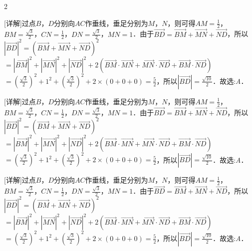 \documentclass[fontset=none]{ctexart}
\begin{document}
\begin{multicols}{2}
\noindent\begin{minipage}[t]{41.000mm}\raggedright [详解]过点\(B\)，\(D\)分别向\(AC\)作垂线，垂足分别为\(M\)，\(N\)，则可得\(AM = \frac{1}{2}\)，\(BM = \frac{\sqrt{3}}{2}\)，\(CN = \frac{1}{2}\)，\(DN = \frac{\sqrt{3}}{2}\)，\(MN = 1\)．由于\(\overrightarrow{BD} = \overrightarrow{BM} + \overrightarrow{MN} + \overrightarrow{ND}\)，所以\(|\overrightarrow{BD}|^{2} = {(\overrightarrow{BM} + \overrightarrow{MN} + \overrightarrow{ND})}^{2}\)\(= |\overrightarrow{BM}|^{2} + |\overrightarrow{MN}|^{2} + |\overrightarrow{ND}|^{2} + 2(\overrightarrow{BM} \cdot \overrightarrow{MN} + \overrightarrow{MN} \cdot \overrightarrow{ND} + \overrightarrow{BM} \cdot \overrightarrow{ND})\)\(= ( \frac{\sqrt{3}}{2} )^{2} + 1^{2} + ( \frac{\sqrt{3}}{2} )^{2} + 2 \times (0 + 0 + 0) = \frac{5}{2}\)，所以\(|\overrightarrow{BD}| = \frac{\sqrt{10}}{2}\)．故选:\emph{A}．\end{minipage}\par
\vspace{2mm}
\noindent\begin{minipage}[t]{43.000mm}\raggedright [详解]过点\(B\)，\(D\)分别向\(AC\)作垂线，垂足分别为\(M\)，\(N\)，则可得\(AM = \frac{1}{2}\)，\(BM = \frac{\sqrt{3}}{2}\)，\(CN = \frac{1}{2}\)，\(DN = \frac{\sqrt{3}}{2}\)，\(MN = 1\)．由于\(\overrightarrow{BD} = \overrightarrow{BM} + \overrightarrow{MN} + \overrightarrow{ND}\)，所以\(|\overrightarrow{BD}|^{2} = {(\overrightarrow{BM} + \overrightarrow{MN} + \overrightarrow{ND})}^{2}\)\(= |\overrightarrow{BM}|^{2} + |\overrightarrow{MN}|^{2} + |\overrightarrow{ND}|^{2} + 2(\overrightarrow{BM} \cdot \overrightarrow{MN} + \overrightarrow{MN} \cdot \overrightarrow{ND} + \overrightarrow{BM} \cdot \overrightarrow{ND})\)\(= ( \frac{\sqrt{3}}{2} )^{2} + 1^{2} + ( \frac{\sqrt{3}}{2} )^{2} + 2 \times (0 + 0 + 0) = \frac{5}{2}\)，所以\(|\overrightarrow{BD}| = \frac{\sqrt{10}}{2}\)．故选:\emph{A}．\end{minipage}\par
\vspace{2mm}
\noindent\begin{minipage}[t]{44.500mm}\raggedright [详解]过点\(B\)，\(D\)分别向\(AC\)作垂线，垂足分别为\(M\)，\(N\)，则可得\(AM = \frac{1}{2}\)，\(BM = \frac{\sqrt{3}}{2}\)，\(CN = \frac{1}{2}\)，\(DN = \frac{\sqrt{3}}{2}\)，\(MN = 1\)．由于\(\overrightarrow{BD} = \overrightarrow{BM} + \overrightarrow{MN} + \overrightarrow{ND}\)，所以\(|\overrightarrow{BD}|^{2} = {(\overrightarrow{BM} + \overrightarrow{MN} + \overrightarrow{ND})}^{2}\)\(= |\overrightarrow{BM}|^{2} + |\overrightarrow{MN}|^{2} + |\overrightarrow{ND}|^{2} + 2(\overrightarrow{BM} \cdot \overrightarrow{MN} + \overrightarrow{MN} \cdot \overrightarrow{ND} + \overrightarrow{BM} \cdot \overrightarrow{ND})\)\(= ( \frac{\sqrt{3}}{2} )^{2} + 1^{2} + ( \frac{\sqrt{3}}{2} )^{2} + 2 \times (0 + 0 + 0) = \frac{5}{2}\)，所以\(|\overrightarrow{BD}| = \frac{\sqrt{10}}{2}\)．故选:\emph{A}．\end{minipage}\par

\end{multicols}
\end{document}
